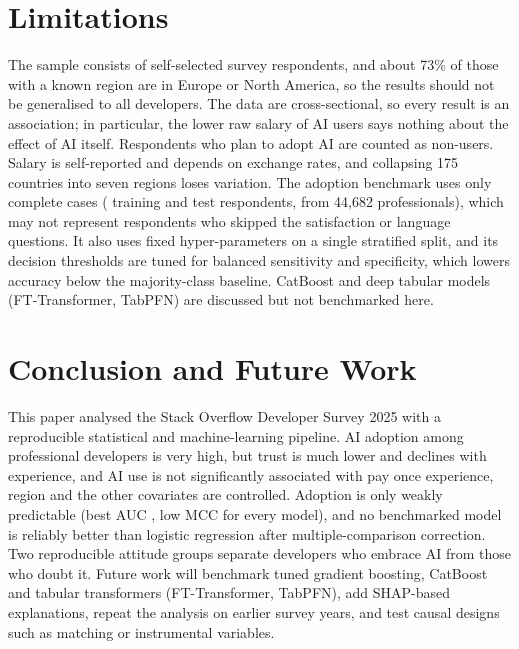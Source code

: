 \documentclass[conference]{IEEEtran}
\begin{document}
\section{Limitations}
The sample consists of self-selected survey respondents, and about 73\% of those with a known region are in Europe or North America, so the results should not be generalised to all developers. The data are cross-sectional, so every result is an association; in particular, the lower raw salary of AI users says nothing about the effect of AI itself. Respondents who plan to adopt AI are counted as non-users. Salary is self-reported and depends on exchange rates, and collapsing 175 countries into seven regions loses variation. The adoption benchmark uses only complete cases (\nTrain{} training and \nTest{} test respondents, from 44{,}682 professionals), which may not represent respondents who skipped the satisfaction or language questions. It also uses fixed hyper-parameters on a single stratified split, and its decision thresholds are tuned for balanced sensitivity and specificity, which lowers accuracy below the majority-class baseline. CatBoost and deep tabular models (FT-Transformer, TabPFN) are discussed but not benchmarked here.

\section{Conclusion and Future Work}
This paper analysed the Stack Overflow Developer Survey 2025 with a reproducible statistical and machine-learning pipeline. AI adoption among professional developers is very high, but trust is much lower and declines with experience, and AI use is not significantly associated with pay once experience, region and the other covariates are controlled. Adoption is only weakly predictable (best AUC \bestAUC, low MCC for every model), and no benchmarked model is reliably better than logistic regression after multiple-comparison correction. Two reproducible attitude groups separate developers who embrace AI from those who doubt it. Future work will benchmark tuned gradient boosting, CatBoost and tabular transformers (FT-Transformer, TabPFN), add SHAP-based explanations, repeat the analysis on earlier survey years, and test causal designs such as matching or instrumental variables.
\end{document}
